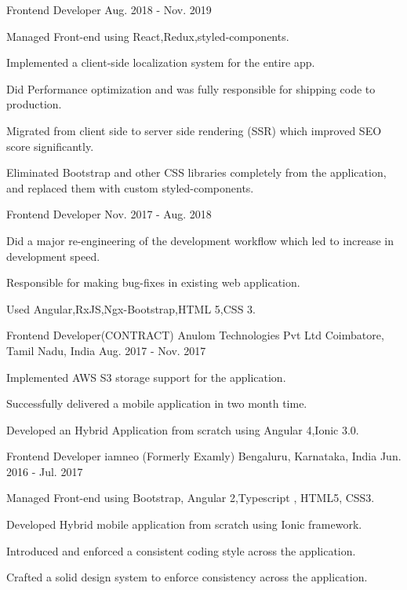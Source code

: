 \begin{cventries}
  \cventry
    {Frontend Developer}
    {}
    {}
    {Aug. 2018 - Nov. 2019}
    {
      \begin{cvitems}
        \item { Managed Front-end using React,Redux,styled-components.}
        \item { Implemented a client-side localization system for the entire app.}
        \item { Did Performance optimization and was fully responsible for shipping code to production.}
        \item { Migrated from client side to server side rendering (SSR) which improved SEO score
        significantly.}
        \item { Eliminated Bootstrap and other CSS libraries completely from the application,
        and replaced them with custom styled-components.}
        \end{cvitems}
    }

  \cventry
    {Frontend Developer}
    {}
    {}
    {Nov. 2017 - Aug. 2018}
    {
      \begin{cvitems}
        \item {Did a major re-engineering of the development workflow which led to
        increase in development speed.}
        \item {Responsible for making bug-fixes in existing web application.}
        \item {Used Angular,RxJS,Ngx-Bootstrap,HTML 5,CSS 3.}
        \end{cvitems}
    }

    
  \cventry
    {Frontend Developer(CONTRACT)}
    {Anulom Technologies Pvt Ltd}
    {Coimbatore, Tamil Nadu, India}
    {Aug. 2017 - Nov. 2017}
    {
      \begin{cvitems}
        \item { Implemented AWS S3 storage support for the application.}
        \item { Successfully delivered a mobile application in two month time.}    
        \item { Developed an Hybrid Application from scratch using Angular 4,Ionic 3.0.}
        \end{cvitems}
    }

  \cventry
    {Frontend Developer}
    {iamneo (Formerly Examly)}
    {Bengaluru, Karnataka, India}
    {Jun. 2016 - Jul. 2017}
    {
      \begin{cvitems}
        \item {Managed Front-end using Bootstrap, Angular 2,Typescript , HTML5, CSS3.}
        \item {Developed Hybrid mobile application from scratch using Ionic framework.}
        \item {Introduced and enforced a consistent coding style across the application.}
        \item {Crafted a solid design system to enforce consistency across the application.}
      \end{cvitems}
    }


\end{cventries}
